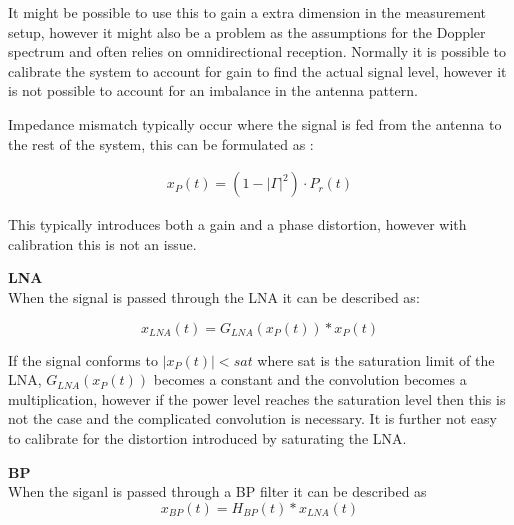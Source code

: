 It might be possible to use this to gain a extra dimension in the measurement setup, however it might also be a problem as the assumptions for the Doppler spectrum and often relies on omnidirectional reception. Normally it is possible to calibrate the system to account for gain to find the actual signal level, however it is not possible to account for an imbalance in the antenna pattern. 


Impedance mismatch typically occur where the signal is fed from the antenna to the rest of the system, this can be formulated as \citep[p. 63]{balanis}:

\begin{align}
x_P(t) = (1-|\Gamma|^2)\cdot P_r(t) \label{eq:ref_power}
\end{align}
\begin{where}
\end{where}

This typically introduces both a gain and a phase distortion, however with calibration this is not an issue.

\textbf{\Gls{LNA}}\\
When the signal is passed through the LNA it can be described as:

\begin{equation}
x_{LNA}(t) = G_{LNA}\left(x_P(t)\right)*x_P(t)
\end{equation}
\begin{where}
\end{where}

If the signal conforms to $|x_P(t)| < sat$ where sat is the saturation limit of the LNA, $G_{LNA}\left(x_P(t)\right)$ becomes a constant and the convolution becomes a multiplication, however if the power level reaches the saturation level then this is not the case and the complicated convolution is necessary. It is further not easy to calibrate for the distortion introduced by saturating the LNA.


\textbf{\Gls{BP}}\\
When the siganl is passed through a BP filter it can be described as
\begin{equation}
x_{BP}(t) = H_{BP}(t)*x_{LNA}(t)
\end{equation}
\begin{where}
\end{where}

